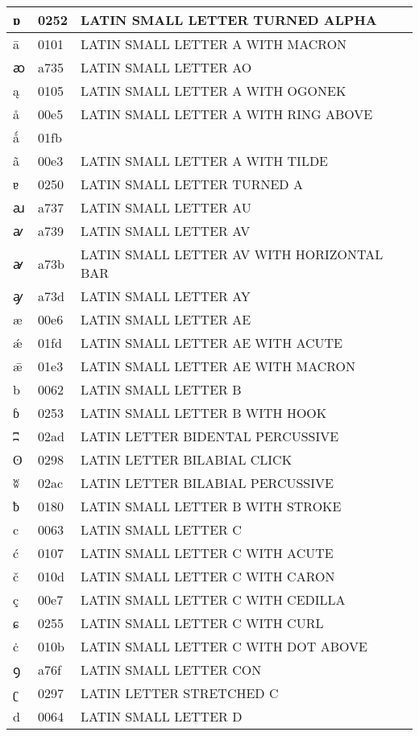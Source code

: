 \documentclass[12pt,letterpaper,openany]{book}
\begin{document}
\begin{center}
\begin{supertabular}{|m{0.25in}|m{0.5in}|m{4in}|}
ɒ & 0252 & LATIN SMALL LETTER TURNED ALPHA\\\hline
ā & 0101 & LATIN SMALL LETTER A WITH MACRON\\\hline
ꜵ & a735 & LATIN SMALL LETTER AO\\\hline
ą & 0105 & LATIN SMALL LETTER A WITH OGONEK\\\hline
å & 00e5 & LATIN SMALL LETTER A WITH RING ABOVE\\\hline
ǻ & 01fb & \\\hline
ã & 00e3 & LATIN SMALL LETTER A WITH TILDE\\\hline
ɐ & 0250 & LATIN SMALL LETTER TURNED A\\\hline
ꜷ & a737 & LATIN SMALL LETTER AU\\\hline
ꜹ & a739 & LATIN SMALL LETTER AV\\\hline
ꜻ & a73b & LATIN SMALL LETTER AV WITH HORIZONTAL BAR\\\hline
ꜽ & a73d & LATIN SMALL LETTER AY\\\hline
æ & 00e6 & LATIN SMALL LETTER AE\\\hline
ǽ & 01fd & LATIN SMALL LETTER AE WITH ACUTE\\\hline
ǣ & 01e3 & LATIN SMALL LETTER AE WITH MACRON\\\hline
b & 0062 & LATIN SMALL LETTER B\\\hline
ɓ & 0253 & LATIN SMALL LETTER B WITH HOOK\\\hline
ʭ & 02ad & LATIN LETTER BIDENTAL PERCUSSIVE\\\hline
ʘ & 0298 & LATIN LETTER BILABIAL CLICK\\\hline
ʬ & 02ac & LATIN LETTER BILABIAL PERCUSSIVE\\\hline
ƀ & 0180 & LATIN SMALL LETTER B WITH STROKE\\\hline
c & 0063 & LATIN SMALL LETTER C\\\hline
ć & 0107 & LATIN SMALL LETTER C WITH ACUTE\\\hline
č & 010d & LATIN SMALL LETTER C WITH CARON\\\hline
ç & 00e7 & LATIN SMALL LETTER C WITH CEDILLA\\\hline
ɕ & 0255 & LATIN SMALL LETTER C WITH CURL\\\hline
ċ & 010b & LATIN SMALL LETTER C WITH DOT ABOVE\\\hline
ꝯ & a76f & LATIN SMALL LETTER CON\\\hline
ʗ & 0297 & LATIN LETTER STRETCHED C\\\hline
d & 0064 & LATIN SMALL LETTER D\\\hline

\end{supertabular}
\end{center}
\end{document}
